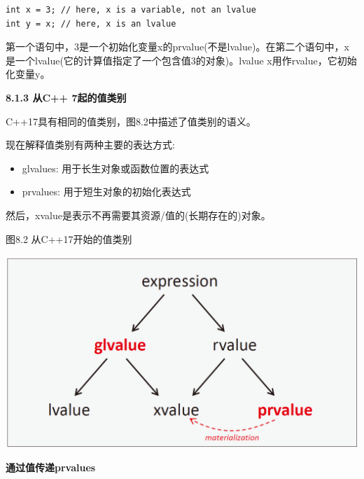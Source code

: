 \begin{lstlisting}[caption={}]
int x = 3; // here, x is a variable, not an lvalue
int y = x; // here, x is an lvalue
\end{lstlisting}

第一个语句中，3是一个初始化变量x的prvalue(不是lvalue)。在第二个语句中，x是一个lvalue(它的计算值指定了一个包含值3的对象)。lvalue x用作rvalue，它初始化变量y。\par

\hspace*{\fill} \par %
\textbf{8.1.3 从C++ 7起的值类别}

C++17具有相同的值类别，图8.2中描述了值类别的语义。\par

现在解释值类别有两种主要的表达方式:\par

\begin{itemize}
	\item glvalues: 用于长生对象或函数位置的表达式
	\item prvalues: 用于短生对象的初始化表达式
\end{itemize}

然后，xvalue是表示不再需要其资源/值的(长期存在的)对象。\par

\hspace*{\fill} \par %
图8.2 从C++17开始的值类别\par

\begin{center}
	\includegraphics[width=1.0\textwidth]{content/1/chapter8/images/2}
\end{center}

\hspace*{\fill} \par %
\textbf{通过值传递prvalues}

